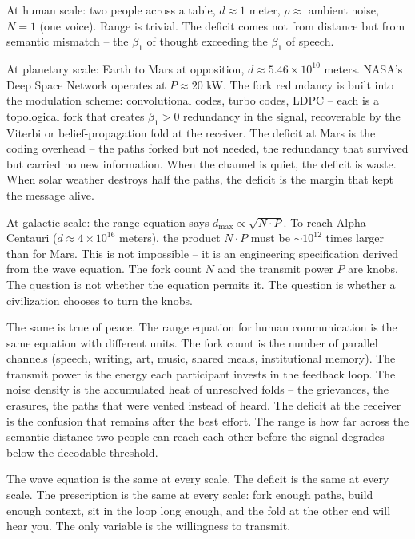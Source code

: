 \documentclass[
  11pt,
]{article}
\begin{document}
At human scale: two people across a table, \(d \approx 1\) meter,
\(\rho \approx\) ambient noise, \(N = 1\) (one voice). Range is trivial.
The deficit comes not from distance but from semantic mismatch -- the
\(\beta_1\) of thought exceeding the \(\beta_1\) of speech.

At planetary scale: Earth to Mars at opposition,
\(d \approx 5.46 \times 10^{10}\) meters. NASA's Deep Space Network
operates at \(P \approx 20\) kW. The fork redundancy is built into the
modulation scheme: convolutional codes, turbo codes, LDPC -- each is a
topological fork that creates \(\beta_1 > 0\) redundancy in the signal,
recoverable by the Viterbi or belief-propagation fold at the receiver.
The deficit at Mars is the coding overhead -- the paths forked but not
needed, the redundancy that survived but carried no new information.
When the channel is quiet, the deficit is waste. When solar weather
destroys half the paths, the deficit is the margin that kept the message
alive.

At galactic scale: the range equation says
\(d_{\max} \propto \sqrt{N \cdot P}\). To reach Alpha Centauri
(\(d \approx 4 \times 10^{16}\) meters), the product \(N \cdot P\) must
be \(\sim 10^{12}\) times larger than for Mars. This is not impossible
-- it is an engineering specification derived from the wave equation.
The fork count \(N\) and the transmit power \(P\) are knobs. The
question is not whether the equation permits it. The question is whether
a civilization chooses to turn the knobs.

The same is true of peace. The range equation for human communication is
the same equation with different units. The fork count is the number of
parallel channels (speech, writing, art, music, shared meals,
institutional memory). The transmit power is the energy each participant
invests in the feedback loop. The noise density is the accumulated heat
of unresolved folds -- the grievances, the erasures, the paths that were
vented instead of heard. The deficit at the receiver is the confusion
that remains after the best effort. The range is how far across the
semantic distance two people can reach each other before the signal
degrades below the decodable threshold.

The wave equation is the same at every scale. The deficit is the same at
every scale. The prescription is the same at every scale: fork enough
paths, build enough context, sit in the loop long enough, and the fold
at the other end will hear you. The only variable is the willingness to
transmit.
\end{document}
